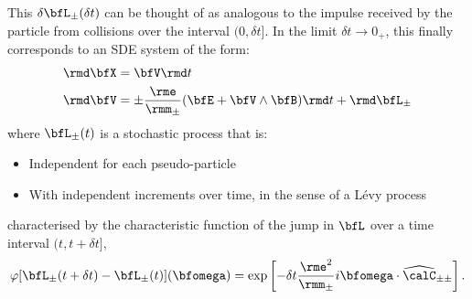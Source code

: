     This $\delta\bfL_{\pm}(\delta t)$ can be thought of as analogous to the impulse received by the particle from collisions over the interval $(0, \delta t]$. In the limit $\delta t  \rightarrow  0_{+}$, this finally corresponds to an SDE system of the form:
    \begin{align}
        \rmd\bfX  &=  \bfV\rmd t  \\
        \rmd\bfV  &=  \pm\frac{\rme}{\rmm_{\pm}}(\bfE + \bfV\wedge\bfB)\rmd t + \rmd\bfL_{\pm}
    \end{align}
    where $\bfL_{\pm}(t)$ is a stochastic process that is:
    \begin{itemize}
        \item  Independent for each pseudo-particle
        \item  With independent increments over time, in the sense of a Lévy process
    \end{itemize}
    characterised by the characteristic function of the jump in $\bfL$ over a time interval $(t, t + \delta t]$,
    \begin{equation}\label{eqn:Levy process characteristic function}
        \varphi[\bfL_{\pm}(t + \delta t) - \bfL_{\pm}(t)](\bfomega)  =  \exp\left[- \delta t\frac{\rme^{2}}{\rmm_{\pm}}i\bfomega\cdot\widehat{\calC}_{\pm\pm}\right].
    \end{equation}

